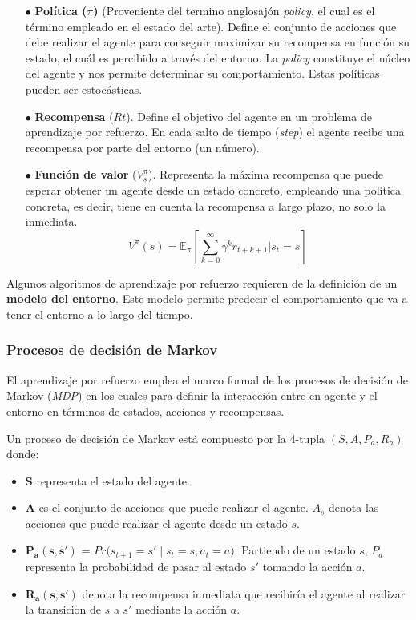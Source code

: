 \begin{itemize}
	\item[$\bullet$] \textbf{Política ($\pi$)}  (Proveniente del termino anglosajón \textit{policy}, el cual es el término empleado en el estado del arte). Define el conjunto de acciones que debe realizar el agente para conseguir maximizar su recompensa en función su estado, el cuál es percibido a través del entorno. La \textit{policy} constituye el núcleo del agente y nos permite determinar su comportamiento. Estas políticas pueden ser estocásticas.
	
	\item[$\bullet$] \textbf{Recompensa} ($Rt$). 
	Define el objetivo del agente en un problema de aprendizaje por refuerzo. En cada salto de tiempo (\textit{step}) el agente recibe una recompensa por parte del entorno (un número). 
	
	\item[$\bullet$] \textbf{Función de valor} ($V^\pi_s$). Representa la máxima recompensa que puede esperar obtener un agente desde un estado concreto, empleando una política concreta, es decir, tiene en cuenta la recompensa a largo plazo, no solo la inmediata.
	\begin{equation}
		V^\pi(s)= \mathbb{E}_\pi\left[\sum_{k=0}^{\infty}{\gamma^k r_{t+k+1}}\Big|s_t=s\right]
	\end{equation}
		
\end{itemize}
Algunos algoritmos de aprendizaje por refuerzo requieren de la definición de un \textbf{modelo del entorno}. Este modelo permite predecir el comportamiento que va a tener el entorno a lo largo del tiempo.

\subsubsection{Procesos de decisión de Markov}

El aprendizaje por refuerzo emplea el marco formal de los procesos de decisión de Markov (\textit{MDP}) en los cuales para definir la interacción entre en agente y el entorno en términos de estados, acciones y recompensas.

Un proceso de decisión de Markov está compuesto por la 4-tupla $(S,A,P_a,R_a)$ donde:

\begin{itemize}
	\item \textbf{S} representa el estado del agente.
	\item \textbf{A} es el conjunto de acciones que puede realizar el agente. $A_s$ denota las acciones que puede realizar el agente desde un estado $s$.
	\item \textbf{$\boldsymbol{P_a(s,s')}$} = $Pr\big(s_{t+1} = s' \;|\; s_t = s , a_t = a  \big)$. Partiendo de un estado $s$, $P_a$ representa la probabilidad de pasar al estado $s'$ tomando la acción $a$.
	\item \textbf{$\boldsymbol{R_a(s,s')}$} denota la recompensa inmediata que recibiría el agente al realizar la transicion de $s$ a $s'$ mediante la acción $a$.
\end{itemize}


